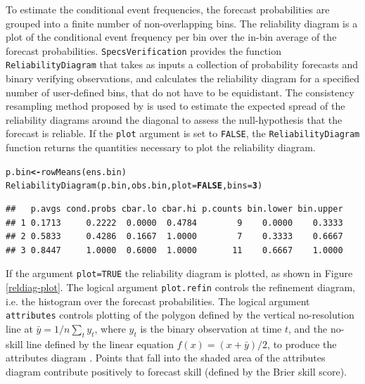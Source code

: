 \documentclass[10pt]{article}\usepackage[]{graphicx}\usepackage[]{color}
\makeatletter
\newcommand{\hlnum}[1]{\textcolor[rgb]{0.502,0,0.502}{\textbf{#1}}}%
\newcommand{\hlstd}[1]{\textcolor[rgb]{0,0,0}{#1}}%
\newcommand{\hlkwb}[1]{\textcolor[rgb]{0.502,0.502,0.753}{\textbf{#1}}}%
\newcommand{\hlkwc}[1]{\textcolor[rgb]{0,0.502,0.753}{#1}}%
\newcommand{\hlkwd}[1]{\textcolor[rgb]{0,0.267,0.4}{#1}}%
\newenvironment{kframe}{%
 \def\at@end@of@kframe{}%
 \ifinner\ifhmode%
  \def\at@end@of@kframe{\end{minipage}}%
  \begin{minipage}{\columnwidth}%
 \fi\fi%
 \def\FrameCommand##1{\hskip\@totalleftmargin \hskip-\fboxsep
 \colorbox{shadecolor}{##1}\hskip-\fboxsep
     \hskip-\linewidth \hskip-\@totalleftmargin \hskip\columnwidth}%
 \MakeFramed {\advance\hsize-\width
   \@totalleftmargin\z@ \linewidth\hsize
   \@setminipage}}%
 {\par\unskip\endMakeFramed%
 \at@end@of@kframe}
\newenvironment{knitrout}{}{} %
\newcommand{\pkg}[1]{\texttt{#1}}
\newcommand{\code}[1]{\texttt{#1}}
\makeatother
\begin{document}
To estimate the conditional event frequencies, the forecast probabilities are grouped into a finite number of non-overlapping bins.
The reliability diagram is a plot of the conditional event frequency per bin over the in-bin average of the forecast probabilities.
\pkg{SpecsVerification} provides the function \code{ReliabilityDiagram} that takes as inputs a collection of probability forecasts and binary verifying observations, and calculates the reliability diagram for a specified number of user-defined bins,  that do not have to be equidistant.
The consistency resampling method proposed by \citet{broecker2007increasing} is used to estimate the expected spread of the reliability diagrams around the diagonal to assess the null-hypothesis that the forecast is reliable.
If the \code{plot} argument is set to \code{FALSE}, the \code{ReliabilityDiagram} function returns the quantities necessary to plot the reliability diagram.
%
\begin{knitrout}
\color{fgcolor}\begin{kframe}
\begin{alltt}
\hlstd{p.bin} \hlkwb{<-} \hlkwd{rowMeans}\hlstd{(ens.bin)}
\hlkwd{ReliabilityDiagram}\hlstd{(p.bin, obs.bin,} \hlkwc{plot}\hlstd{=}\hlnum{FALSE}\hlstd{,} \hlkwc{bins}\hlstd{=}\hlnum{3}\hlstd{)}
\end{alltt}
\begin{verbatim}
##   p.avgs cond.probs cbar.lo cbar.hi p.counts bin.lower bin.upper
## 1 0.1713     0.2222  0.0000  0.4784        9    0.0000    0.3333
## 2 0.5833     0.4286  0.1667  1.0000        7    0.3333    0.6667
## 3 0.8447     1.0000  0.6000  1.0000       11    0.6667    1.0000
\end{verbatim}
\end{kframe}
\end{knitrout}
%
If the argument \code{plot=TRUE} the reliability diagram is plotted, as shown in Figure \ref{reldiag-plot}. 
The logical argument \code{plot.refin} controls the refinement diagram, i.e. the histogram over the forecast probabilities.
The logical argument \code{attributes} controls plotting of the polygon defined by the vertical no-resolution line at $\bar{y} = 1/n \sum_t y_t$, where $y_t$ is the binary observation at time $t$, and the no-skill line defined by the linear equation $f(x)=(x+\bar{y})/2$, to produce the attributes diagram \citep{hsu1986attributes}.
Points that fall into the shaded area of the attributes diagram contribute positively to forecast skill (defined by the Brier skill score).
\end{document}
